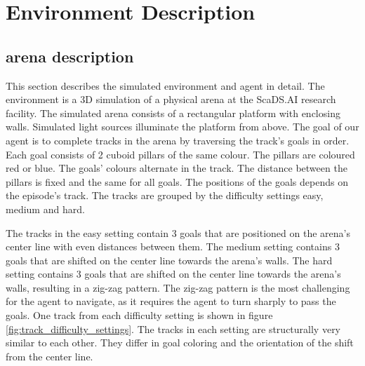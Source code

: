 \chapter{Environment Description}
\label{cha:env_description}
\lipsum \autocite{DBLP:books/sp/HarderR01}



\section{arena description}


This section describes the simulated environment and agent in detail. The environment is a 3D simulation of a physical arena at the ScaDS.AI research facility. The simulated arena consists of a rectangular platform with enclosing walls. Simulated light sources illuminate the platform from above.
The goal of our agent is to complete tracks in the arena by traversing the track's goals in order. Each goal consists of 2 cuboid pillars of the same colour. The pillars are coloured red or blue. The goals' colours alternate in the track. The distance between the pillars is fixed and the same for all goals. The positions of the goals depends on the episode's track. The tracks are grouped by the difficulty settings easy, medium and hard. 

The tracks in the easy setting contain 3 goals that are positioned on the arena's center line with even distances between them. The medium setting contains 3 goals that are shifted on the center line towards the arena's walls. The hard setting contains 3 goals that are shifted on the center line towards the arena's walls, resulting in a zig-zag pattern. The zig-zag pattern is the most challenging for the agent to navigate, as it requires the agent to turn sharply to pass the goals. One track from each difficulty setting is shown in figure \ref{fig:track_difficulty_settings}. The tracks in each setting are structurally very similar to each other. They differ in goal coloring and the orientation of the shift from the center line.


